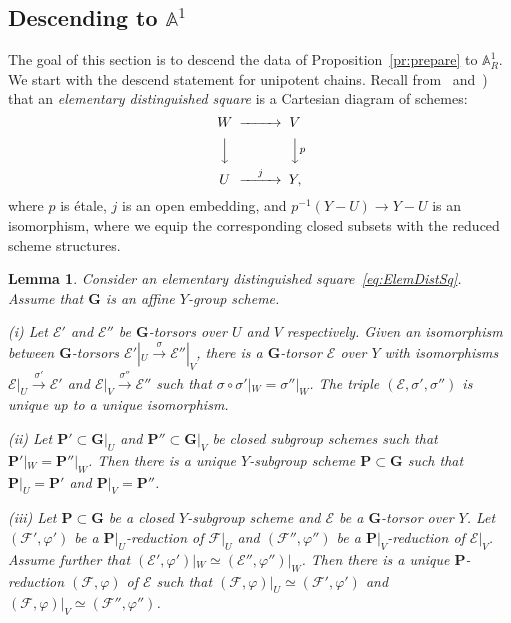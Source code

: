 \documentclass[11pt]{amsart}
\renewcommand{\phi}{\varphi}
\newcommand\A{\mathbb A}
\theoremstyle{plain}
\newtheorem{lemma}[proposition]{Lemma}
\theoremstyle{definition}
\theoremstyle{remark}
\newcommand\cE{{\mathcal{E}}}
\newcommand\cF{{\mathcal{F}}}
\newcommand\bG{{\mathbf G}}
\newcommand\bP{{\mathbf P}}
\begin{document}
\subsection{Descending to \texorpdfstring{$\A^1$}{A1}}\label{sect:DescendA1}
The goal of this section is to descend the data of Proposition~\ref{pr:prepare} to $\A^1_R$. We start with the descend statement for unipotent chains. Recall from~\cite[Ch.~3, Def.~1.3]{MorelVoevodsky} and~\cite[Def.~3]{FedorovNisnevich}) that an \emph{elementary distinguished square\/} is a Cartesian diagram of schemes:
\begin{equation}\label{eq:ElemDistSq}
\begin{CD}
W @>>> V\\
@VVV @VV p V\\
U @>j>> Y,
\end{CD}
\end{equation}
where $p$ is \'etale, $j$ is an open embedding, and $p^{-1}(Y-U)\to Y-U$ is an isomorphism, where we equip the corresponding closed subsets with the reduced scheme structures.

\begin{lemma}\label{lm:Descent}
Consider an elementary distinguished square~\eqref{eq:ElemDistSq}. Assume that $\bG$ is an affine $Y$-group scheme.

(i) Let $\cE'$ and $\cE''$ be $\bG$-torsors over $U$ and $V$ respectively. Given an isomorphism between $\bG$-torsors $\cE'|_U\xrightarrow{\sigma}\cE''|_V$, there is a $\bG$-torsor $\cE$ over $Y$ with isomorphisms $\cE|_U\xrightarrow{\sigma'}\cE'$ and $\cE|_V\xrightarrow{\sigma''}\cE''$ such that $\sigma\circ\sigma'|_W=\sigma''|_W$. The triple $(\cE,\sigma',\sigma'')$ is unique up to a unique isomorphism.

(ii) Let $\bP'\subset\bG|_U$ and $\bP''\subset\bG|_V$ be closed subgroup schemes such that $\bP'|_W=\bP''|_W$. Then there is a unique $Y$-subgroup scheme $\bP\subset\bG$ such that $\bP|_U=\bP'$ and $\bP|_V=\bP''$.

(iii) Let $\bP\subset\bG$ be a closed $Y$-subgroup scheme and $\cE$ be a $\bG$-torsor over $Y$. Let $(\cF',\phi')$ be a $\bP|_U$-reduction of $\cF|_U$ and $(\cF'',\phi'')$ be a $\bP|_V$-reduction of $\cE|_V$. Assume further that $(\cE',\phi')|_W\simeq(\cE'',\phi'')|_W$. Then there is a unique $\bP$-reduction $(\cF,\phi)$ of $\cE$ such that $(\cF,\phi)|_U\simeq(\cF',\phi')$ and $(\cF,\phi)|_V\simeq(\cF'',\phi'')$.
\end{lemma}
\end{document}
